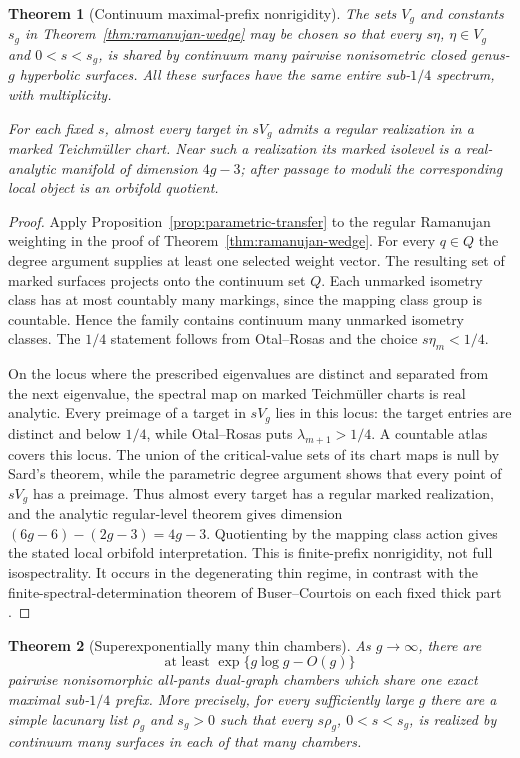 \documentclass[11pt,reqno]{amsart}
\newtheorem{theorem}{Theorem}[section]
\theoremstyle{definition}
\theoremstyle{remark}
\begin{document}
\begin{theorem}[Continuum maximal-prefix nonrigidity]
\label{thm:continuum-prefix}
The sets $V_g$ and constants $s_g$ in
Theorem~\ref{thm:ramanujan-wedge} may be chosen so that every
$s\eta$, $\eta\in V_g$ and $0<s<s_g$, is shared by continuum many pairwise
nonisometric closed genus-$g$ hyperbolic surfaces.  All these surfaces have
the same entire sub-$1/4$ spectrum, with multiplicity.

For each fixed $s$, almost every target in $sV_g$ admits a regular realization
in a marked Teichm\"uller chart.  Near such a realization its marked isolevel
is a real-analytic manifold of dimension $4g-3$; after passage to moduli the
corresponding local object is an orbifold quotient.
\end{theorem}

\begin{proof}
Apply Proposition~\ref{prop:parametric-transfer} to the regular Ramanujan
weighting in the proof of Theorem~\ref{thm:ramanujan-wedge}.  For every
$q\in Q$ the degree argument supplies at least one selected weight vector.
The resulting set of marked surfaces projects onto the continuum set $Q$.
Each unmarked isometry class has at most countably many markings, since the
mapping class group is countable.  Hence the family contains continuum many
unmarked isometry classes.  The $1/4$ statement follows from
Otal--Rosas and the choice $s\eta_m<1/4$.

On the locus where the prescribed eigenvalues are distinct and separated
from the next eigenvalue, the spectral map on marked Teichm\"uller charts is
real analytic.  Every preimage of a target in $sV_g$ lies in this locus:
the target entries are distinct and below $1/4$, while Otal--Rosas puts
$\lambda_{m+1}>1/4$.  A countable atlas covers this locus.  The union of the
critical-value sets of its chart maps is null by Sard's theorem, while the
parametric degree argument shows that every point of $sV_g$ has a preimage.
Thus almost every target has a regular marked realization, and the analytic
regular-level theorem gives dimension
$(6g-6)-(2g-3)=4g-3$.  Quotienting by the mapping class action gives the
stated local orbifold interpretation.  This is finite-prefix nonrigidity,
not full isospectrality.  It occurs in the degenerating thin regime, in
contrast with the finite-spectral-determination theorem of
Buser--Courtois on each fixed thick part \cite{BuserCourtois1990}.
\end{proof}

\begin{theorem}[Superexponentially many thin chambers]
\label{thm:many-chambers}
As $g\to\infty$, there are
\[
 \text{at least }\exp\{g\log g-O(g)\}
\]
pairwise nonisomorphic all-pants dual-graph chambers which share one exact
maximal sub-$1/4$ prefix.  More precisely, for every sufficiently large
$g$ there are a simple lacunary list $\rho_g$ and $s_g>0$ such that every
$s\rho_g$, $0<s<s_g$, is realized by continuum many surfaces in each of
that many chambers.
\end{theorem}
\end{document}
